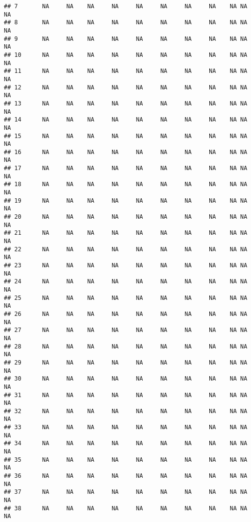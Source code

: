 \documentclass[]{article}
\begin{document}
\begin{verbatim}
## 7       NA     NA    NA     NA     NA     NA     NA     NA    NA NA          NA
## 8       NA     NA    NA     NA     NA     NA     NA     NA    NA NA          NA
## 9       NA     NA    NA     NA     NA     NA     NA     NA    NA NA          NA
## 10      NA     NA    NA     NA     NA     NA     NA     NA    NA NA          NA
## 11      NA     NA    NA     NA     NA     NA     NA     NA    NA NA          NA
## 12      NA     NA    NA     NA     NA     NA     NA     NA    NA NA          NA
## 13      NA     NA    NA     NA     NA     NA     NA     NA    NA NA          NA
## 14      NA     NA    NA     NA     NA     NA     NA     NA    NA NA          NA
## 15      NA     NA    NA     NA     NA     NA     NA     NA    NA NA          NA
## 16      NA     NA    NA     NA     NA     NA     NA     NA    NA NA          NA
## 17      NA     NA    NA     NA     NA     NA     NA     NA    NA NA          NA
## 18      NA     NA    NA     NA     NA     NA     NA     NA    NA NA          NA
## 19      NA     NA    NA     NA     NA     NA     NA     NA    NA NA          NA
## 20      NA     NA    NA     NA     NA     NA     NA     NA    NA NA          NA
## 21      NA     NA    NA     NA     NA     NA     NA     NA    NA NA          NA
## 22      NA     NA    NA     NA     NA     NA     NA     NA    NA NA          NA
## 23      NA     NA    NA     NA     NA     NA     NA     NA    NA NA          NA
## 24      NA     NA    NA     NA     NA     NA     NA     NA    NA NA          NA
## 25      NA     NA    NA     NA     NA     NA     NA     NA    NA NA          NA
## 26      NA     NA    NA     NA     NA     NA     NA     NA    NA NA          NA
## 27      NA     NA    NA     NA     NA     NA     NA     NA    NA NA          NA
## 28      NA     NA    NA     NA     NA     NA     NA     NA    NA NA          NA
## 29      NA     NA    NA     NA     NA     NA     NA     NA    NA NA          NA
## 30      NA     NA    NA     NA     NA     NA     NA     NA    NA NA          NA
## 31      NA     NA    NA     NA     NA     NA     NA     NA    NA NA          NA
## 32      NA     NA    NA     NA     NA     NA     NA     NA    NA NA          NA
## 33      NA     NA    NA     NA     NA     NA     NA     NA    NA NA          NA
## 34      NA     NA    NA     NA     NA     NA     NA     NA    NA NA          NA
## 35      NA     NA    NA     NA     NA     NA     NA     NA    NA NA          NA
## 36      NA     NA    NA     NA     NA     NA     NA     NA    NA NA          NA
## 37      NA     NA    NA     NA     NA     NA     NA     NA    NA NA          NA
## 38      NA     NA    NA     NA     NA     NA     NA     NA    NA NA          NA

\end{verbatim}
\end{document}
